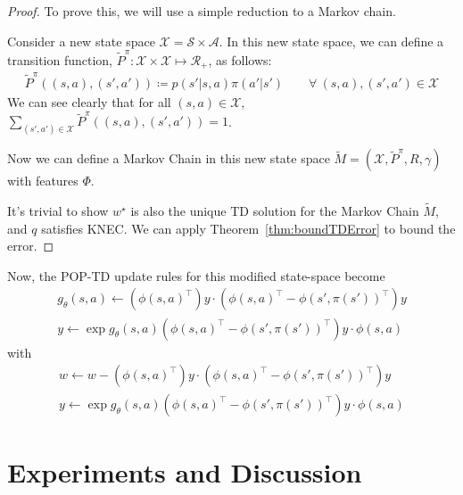 \begin{proof}
  To prove this, we will use a simple reduction to a Markov chain.

  Consider a new state space $\mathcal{X} = \mathcal{S} \times \mathcal{A}$.
  In this new state space, we can define a transition function, $\tilde{P}^\pi : \mathcal{X} \times \mathcal{X} \mapsto \mathcal{R}_+$, as follows:
  \begin{align*}
    \tilde{P}^\pi((s, a), (s', a')) \coloneqq p(s'|s, a) \pi(a'|s') \quad \quad \forall \ (s, a), (s', a') \in \mathcal{X}
  \end{align*}
  We can see clearly that for all $(s, a) \in \mathcal{X}$, $\sum_{(s', a') \in \mathcal{X}} \tilde{P}^\pi((s, a), (s', a')) = 1$.

  Now we can define a Markov Chain in this new state space $\tilde{M} = (\mathcal{X}, \tilde{P}^\pi, R, \gamma)$ with features $\Phi$.

  It's trivial to show $w^\star$ is also the unique TD solution for the Markov Chain $\tilde{M}$,
  and $q$ satisfies KNEC. We can apply Theorem~\ref{thm:boundTDError} to bound the error.

\end{proof}

Now, the POP-TD update rules for this modified state-space become
\begin{align}
  g_\theta(s, a) \gets (\phi(s, a)^\top) y \cdot (\phi(s,a )^\top - \phi(s', \pi(s'))^\top) y \\
  y \gets \exp{g_\theta(s,a)} (\phi(s,a)^\top - \phi(s', \pi(s'))^\top) y \cdot \phi(s, a)
\end{align}
with
\begin{align}
  w \gets w - (\phi(s, a)^\top) y \cdot (\phi(s,a )^\top - \phi(s', \pi(s'))^\top) y \\
  y \gets \exp{g_\theta(s,a)} (\phi(s,a)^\top - \phi(s', \pi(s'))^\top) y \cdot \phi(s, a)
\end{align}


\section{Experiments and Discussion}

